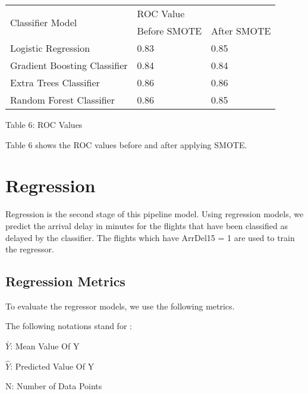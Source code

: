 \documentclass[12pt,letterpaper]{article}
\begin{document}
            \begin{table}[H]
                \begin{center}
                    \begin{tabular}{|l|l|l|}
                        \hline
                        \multirow{2}{*}{Classifier Model} & \multicolumn{2}{l|}{ROC Value} \\ \cline{2-3} 
                        & Before SMOTE   & After SMOTE   \\ \hline
                        Logistic Regression               & 0.83           & 0.85          \\ \hline
                        Gradient Boosting Classifier       & 0.84           & 0.84          \\ \hline
                        Extra Trees Classifier             & 0.86           & 0.86          \\ \hline
                        Random Forest Classifier           & 0.86           & 0.85          \\ \hline
                    \end{tabular}
                \end{center}
                \begin{center}
                    Table 6: ROC Values
                \end{center}
                
            Table 6 shows the ROC values before and after applying SMOTE.
            \end{table}
            
\section{Regression}

     Regression is the second stage of this pipeline model. Using regression models, we predict the arrival delay in minutes for the flights that have been classified as delayed by the classifier. The flights which have ArrDel15 = 1 are used to train the regressor.
  
    \subsection*{Regression Metrics}
 
        To evaluate the regressor models, we use the following metrics.
        
        \begin{flushleft}
        
            The following notations stand for : 
            
            $\bar{Y}$: Mean Value Of Y
        
            $\hat{Y}$: Predicted Value Of Y
        
            N: Number of Data Points
        
        \end{flushleft}
        
\end{document}
